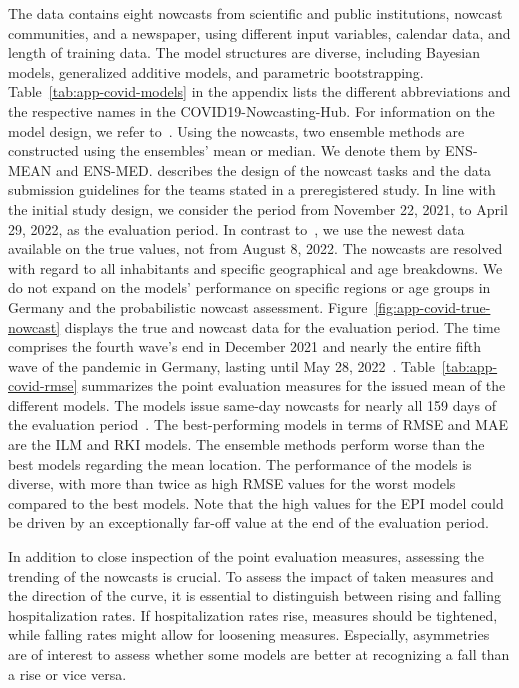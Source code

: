 The data contains eight nowcasts from scientific and public institutions, nowcast communities, and a newspaper, using different input variables, calendar data, and length of training data.
The model structures are diverse, including Bayesian models, generalized additive models, and parametric bootstrapping.
Table~\ref{tab:app-covid-models} in the appendix lists the different abbreviations and the respective names in the COVID19-Nowcasting-Hub.
For information on the model design, we refer to~\textcite{Wolffram2023}.
Using the nowcasts, two ensemble methods are constructed using the ensembles' mean or median.
We denote them by ENS-MEAN and ENS-MED.
\textcite{Wolffram2023} describes the design of the nowcast tasks and the data submission guidelines for the teams stated in a preregistered study. 
In line with the initial study design, we consider the period from November 22, 2021, to April 29, 2022, as the evaluation period.
In contrast to~\textcite{Wolffram2023}, we use the newest data available on the true values, not from August 8, 2022.
The nowcasts are resolved with regard to all inhabitants and specific geographical and age breakdowns.
We do not expand on the models' performance on specific regions or age groups in Germany and the probabilistic nowcast assessment.
Figure~\ref{fig:app-covid-true-nowcast} displays the true and nowcast data for the evaluation period.
The time comprises the fourth wave's end in December 2021 and nearly the entire fifth wave of the pandemic in Germany, lasting until May 28, 2022~\parencite{Tolksdorf2022}.
Table~\ref{tab:app-covid-rmse} summarizes the point evaluation measures for the issued mean of the different models.
The models issue same-day nowcasts for nearly all 159 days of the evaluation period~\parencite[for explanations of the missing values, see][Tables A2, A3, and A4]{Wolffram2023}.
The best-performing models in terms of RMSE and MAE are the ILM and RKI models.
The ensemble methods perform worse than the best models regarding the mean location.
The performance of the models is diverse, with more than twice as high RMSE values for the worst models compared to the best models.
Note that the high values for the EPI model could be driven by an exceptionally far-off value at the end of the evaluation period.

In addition to close inspection of the point evaluation measures, assessing the trending of the nowcasts is crucial.
To assess the impact of taken measures and the direction of the curve, it is essential to distinguish between rising and falling hospitalization rates.
If hospitalization rates rise, measures should be tightened, while falling rates might allow for loosening measures.
Especially, asymmetries are of interest to assess whether some models are better at recognizing a fall than a rise or vice versa.

